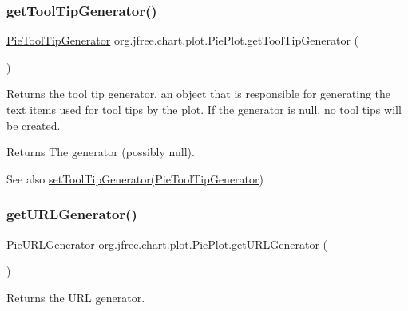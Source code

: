 \subsubsection{\texorpdfstring{get\+Tool\+Tip\+Generator()}{getToolTipGenerator()}}
{\footnotesize\ttfamily \mbox{\hyperlink{interfaceorg_1_1jfree_1_1chart_1_1labels_1_1_pie_tool_tip_generator}{Pie\+Tool\+Tip\+Generator}} org.\+jfree.\+chart.\+plot.\+Pie\+Plot.\+get\+Tool\+Tip\+Generator (\begin{DoxyParamCaption}{ }\end{DoxyParamCaption})}

Returns the tool tip generator, an object that is responsible for generating the text items used for tool tips by the plot. If the generator is {\ttfamily null}, no tool tips will be created.

\begin{DoxyReturn}{Returns}
The generator (possibly {\ttfamily null}).
\end{DoxyReturn}
\begin{DoxySeeAlso}{See also}
\mbox{\hyperlink{classorg_1_1jfree_1_1chart_1_1plot_1_1_pie_plot_ad520cee8df753e527fc1e1376780de84}{set\+Tool\+Tip\+Generator(\+Pie\+Tool\+Tip\+Generator)}} 
\end{DoxySeeAlso}
\mbox{\label{classorg_1_1jfree_1_1chart_1_1plot_1_1_pie_plot_a220bcaff244eda547e1c31db90ae60a8}} 
\subsubsection{\texorpdfstring{get\+U\+R\+L\+Generator()}{getURLGenerator()}}
{\footnotesize\ttfamily \mbox{\hyperlink{interfaceorg_1_1jfree_1_1chart_1_1urls_1_1_pie_u_r_l_generator}{Pie\+U\+R\+L\+Generator}} org.\+jfree.\+chart.\+plot.\+Pie\+Plot.\+get\+U\+R\+L\+Generator (\begin{DoxyParamCaption}{ }\end{DoxyParamCaption})}

Returns the U\+RL generator.

